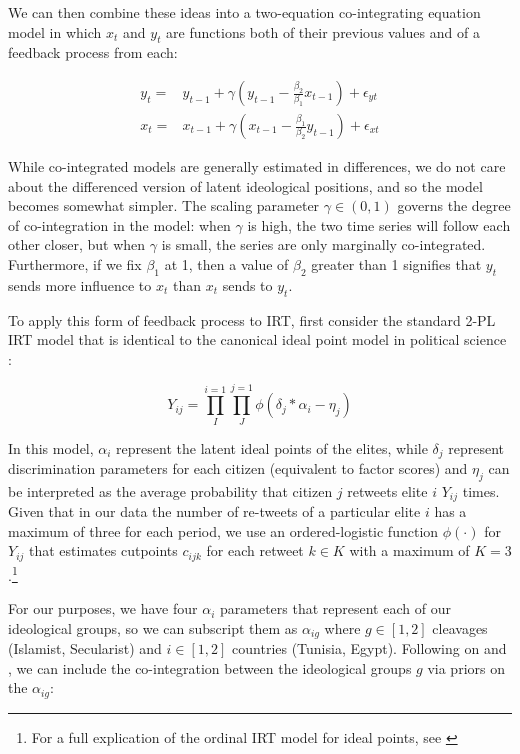 \documentclass[12pt]{article}
\begin{document}
We can then combine these ideas into a two-equation co-integrating equation model in which $x_t$ and $y_t$ are functions both of their previous values and of a feedback process from each:

\begin{align}
 y_t =& y_{t-1} + \gamma (y_{t-1} - \frac{\beta_2}{\beta_1}x_{t-1}) + \epsilon_{yt}\\
  x_t =& x_{t-1} + \gamma (x_{t-1} - \frac{\beta_1}{\beta_2}y_{t-1}) + \epsilon_{xt}
\end{align}

While co-integrated models are generally estimated in differences, we do not care about the differenced version of latent ideological positions, and so the model becomes somewhat simpler. The scaling parameter $\gamma \in (0,1)$ governs the degree of co-integration in the model: when $\gamma$ is high, the two time series will follow each other closer, but when $\gamma$ is small, the series are only marginally co-integrated. Furthermore, if we fix $\beta_1$ at 1, then a value of $\beta_2$ greater than 1 signifies that $y_t$ sends more influence to $x_t$ than $x_t$ sends to $y_t$. 

To apply this form of feedback process to IRT, first consider the standard 2-PL IRT model that is identical to the canonical ideal point model in political science \parencite{jackman2004}:

\begin{equation}
Y_{ij} = \prod^{i=1}_I \prod^{j=1}_J \phi(\delta_j * \alpha_i - \eta_j)
\end{equation}

In this model, $\alpha_i$ represent the latent ideal points of the elites, while $\delta_j$ represent discrimination parameters for each citizen (equivalent to factor scores) and $\eta_j$ can be interpreted as the average probability that citizen $j$ retweets elite $i$ $Y_{ij}$ times. Given that in our data the number of re-tweets of a particular elite $i$ has a maximum of three for each period, we use an ordered-logistic function $\phi(\cdot)$ for $Y_{ij}$ that estimates cutpoints $c_{ijk}$ for each retweet $k \in K$ with a maximum of $K=3$.\footnote{For a full explication of the ordinal IRT model for ideal points, see \parencite{kubinec2017}}

For our purposes, we have four $\alpha_i$ parameters that represent each of our ideological groups, so we can subscript them as $\alpha_{ig}$ where $g \in [1,2]$ cleavages (Islamist, Secularist) and $i \in [1,2]$ countries (Tunisia, Egypt).  Following on \textcite{quinn2002} and \textcite{kropko2013}, we can include the co-integration between the ideological groups $g$ via priors on the $\alpha_{ig}$:
\end{document}

